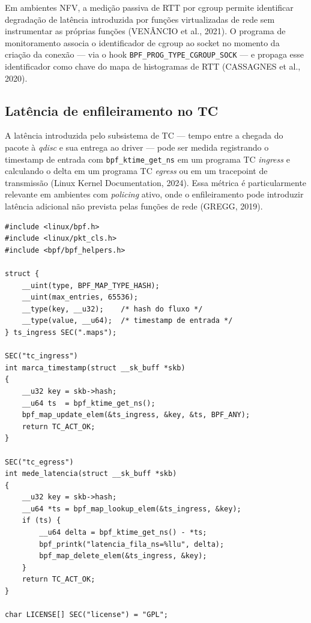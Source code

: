 Em ambientes NFV, a medição passiva de RTT por cgroup permite identificar degradação
de latência introduzida por funções virtualizadas de rede sem instrumentar as próprias
funções (VENÂNCIO et al., 2021). O programa de monitoramento associa o identificador
de cgroup ao socket no momento da criação da conexão — via o hook
\texttt{BPF\_PROG\_TYPE\_CGROUP\_SOCK} — e propaga esse identificador como chave do
mapa de histogramas de RTT (CASSAGNES et al., 2020).

\subsection*{Latência de enfileiramento no TC}

A latência introduzida pelo subsistema de TC — tempo entre a chegada do pacote à
\textit{qdisc} e sua entrega ao driver — pode ser medida registrando o timestamp de
entrada com \texttt{bpf\_ktime\_get\_ns} em um programa TC \textit{ingress} e calculando
o delta em um programa TC \textit{egress} ou em um tracepoint de transmissão (Linux
Kernel Documentation, 2024). Essa métrica é particularmente relevante em ambientes
com \textit{policing} ativo, onde o enfileiramento pode introduzir latência adicional
não prevista pelas funções de rede (GREGG, 2019).

\begin{lstlisting}[caption={Medição de latência de enfileiramento com timestamp BPF.}, label=lst:obs-qdelay]
#include <linux/bpf.h>
#include <linux/pkt_cls.h>
#include <bpf/bpf_helpers.h>

struct {
    __uint(type, BPF_MAP_TYPE_HASH);
    __uint(max_entries, 65536);
    __type(key, __u32);    /* hash do fluxo */
    __type(value, __u64);  /* timestamp de entrada */
} ts_ingress SEC(".maps");

SEC("tc_ingress")
int marca_timestamp(struct __sk_buff *skb)
{
    __u32 key = skb->hash;
    __u64 ts  = bpf_ktime_get_ns();
    bpf_map_update_elem(&ts_ingress, &key, &ts, BPF_ANY);
    return TC_ACT_OK;
}

SEC("tc_egress")
int mede_latencia(struct __sk_buff *skb)
{
    __u32 key = skb->hash;
    __u64 *ts = bpf_map_lookup_elem(&ts_ingress, &key);
    if (ts) {
        __u64 delta = bpf_ktime_get_ns() - *ts;
        bpf_printk("latencia_fila_ns=%llu", delta);
        bpf_map_delete_elem(&ts_ingress, &key);
    }
    return TC_ACT_OK;
}

char LICENSE[] SEC("license") = "GPL";
\end{lstlisting}

